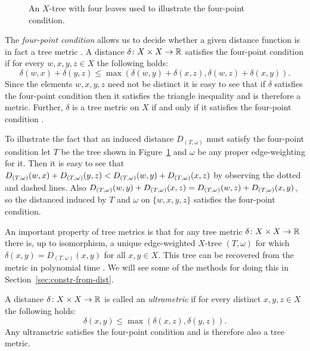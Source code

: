\begin{figure}
  \centering
  
  \caption{An $X$-tree with four leaves used to illustrate the four-point
    condition.}
  \label{fig:quartet-tree}
\end{figure}

The \textit{four-point condition} allows us to decide whether a given distance
function is in fact a tree metric \cite{semple2003phylogenetics}.  A distance
$\delta \colon X \times X \to {\mathbb R}$ satisfies the four-point condition if for
every $w,x,y,z \in X$ the following holds:
\begin{equation*}
  \delta(w,x) + \delta(y,z) \leq \max(\delta(w,y)+\delta(x,z),
                                      \delta(w,z)+\delta(x,y)).
\end{equation*}
Since the elements $w,x,y,z$ need not be distinct it is easy to see that if
$\delta$ satisfies the four-point condition then it satisfies the triangle
inequality and is therefore a metric.  Further, $\delta$ is a tree metric on
$X$ if and only if it satisfies the four-point condition
\citep[Theorem 7.2.6]{semple2003phylogenetics}.

To illustrate the fact that an induced distance $D_{(T,\omega)}$ must satisfy
the four-point condition let $T$ be the tree shown in
Figure~\ref{fig:quartet-tree} and $\omega$ be any proper edge-weighting for
it.  Then it is easy to see that $D_{(T,\omega)}(w,x)+D_{(T,\omega)}(y,z) < D_{(T,\omega)}(w,y)+D_{(T,\omega)}(x,z)$
by observing the dotted and dashed lines.  Also $D_{(T,\omega)}(w,y)+D_{(T,\omega)}(x,z) =
D_{(T,\omega)}(w,z)+D_{(T,\omega)}(x,y)$, so the distanced induced by $T$ and $\omega$ on
$\{w,x,y,z\}$ satisfies the four-point condition.

An important property of tree metrics is that for any tree metric $\delta
\colon X \times X \to {\mathbb R}$ there is, up to isomorphism, a unique edge-weighted
$X$-tree $(T,\omega)$ for which $\delta(x,y) = D_{(T,\omega)}(x,y)$ for all
$x,y \in X$.  This tree can be recovered from the metric in polynomial time
\citep{semple2003phylogenetics}.  We will see some of the methods for doing
this in Section~\ref{sec:constr-from-dist}.

A distance $\delta \colon X \times X \to {\mathbb R}$ is called an
\textit{ultrametric} if for every distinct $x,y,z \in X$ the following holds:
\begin{equation*}
  \delta(x,y) \leq \max(\delta(x,z),\delta(y,z)).
\end{equation*}
Any ultrametric satisfies the four-point condition and is therefore also a
tree metric.

